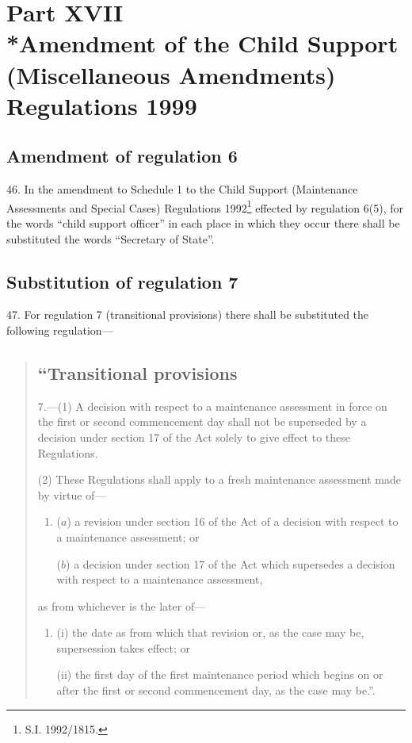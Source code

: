 \documentclass[12pt,a4paper]{article}
\begin{document}
\section[Part XVII --- Amendment of the Child Support (Miscellaneous Amendments) Regulations 1999]{Part XVII\\*Amendment of the Child Support (Miscellaneous Amendments) Regulations 1999}

\renewcommand\parthead{--- Part XVII}

\subsection[46. Amendment of regulation 6]{Amendment of regulation 6}

46.  In the amendment to Schedule 1 to the Child Support (Maintenance Assessments and Special Cases) Regulations 1992\footnote{\frenchspacing S.I. 1992/1815.} effected by regulation 6(5), for the words “child support officer” in each place in which they occur there shall be substituted the words “Secretary of State”.

\subsection[47. Substitution of regulation 7]{Substitution of regulation 7}

47.  For regulation 7 (transitional provisions) there shall be substituted the following regulation—
\begin{quotation}
\subsection*{“Transitional provisions}

7.—(1) A decision with respect to a maintenance assessment in force on the first or second commencement day shall not be superseded by a decision under section 17 of the Act solely to give effect to these Regulations.

(2) These Regulations shall apply to a fresh maintenance assessment made by virtue of—
\begin{enumerate}\item[]
($a$) a revision under section 16 of the Act of a decision with respect to a maintenance assessment; or

($b$) a decision under section 17 of the Act which supersedes a decision with respect to a maintenance assessment,
\end{enumerate}
as from whichever is the later of—
\begin{enumerate}\item[]
(i) the date as from which that revision or, as the case may be, supersession takes effect; or

(ii) the first day of the first maintenance period which begins on or after the first or second commencement day, as the case may be.”.
\end{enumerate}
\end{quotation}
\end{document}
